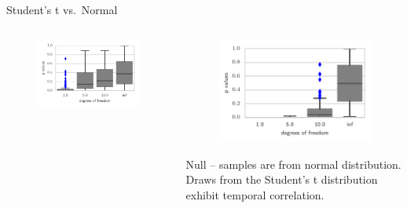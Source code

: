 \documentclass{beamer}
\begin{document}
\begin{frame}{Student's t vs.~Normal}
\begin{columns}
\begin{column}{.5\textwidth}
\begin{figure}
           
            \includegraphics[width=\textwidth]{img/sgld_student} 
        \end{figure}
        \end{column}
        \begin{column}{.5\textwidth}
            \begin{figure}
           \includegraphics[width=\textwidth]{img/sgld_student_opt} 
        \end{figure}
       Null -- samples are from normal distribution. Draws from the Student's t distribution exhibit temporal correlation.
        \end{column}
    \end{columns}
 

\end{frame}
\end{document}

